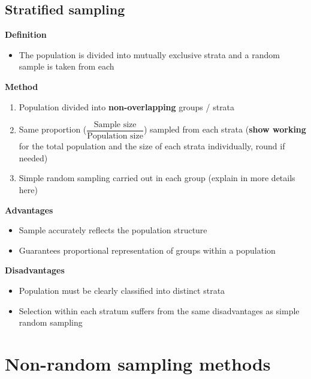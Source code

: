 \documentclass[oneside,fleqn,11pt]{book}
\begin{document}
	\subsection{Stratified sampling}
	\textbf{Definition}
	\begin{itemize}
		\item The population is divided into mutually exclusive strata and a random sample is taken from each
	\end{itemize}
	\textbf{Method}
	\begin{enumerate}
		\item Population divided into \textbf{non-overlapping} groups / strata
		\item Same proportion ($\dfrac{\text{Sample size}}{\text{Population size}}$) sampled from each strata (\textbf{show working} for the total population and the size of each strata individually, round if needed)
		\item Simple random sampling carried out in each group (explain in more details here)
	\end{enumerate}
	\textbf{Advantages}
	\begin{itemize}
		\item Sample accurately reflects the population structure
		\item Guarantees proportional representation of groups within a population
	\end{itemize}
	\textbf{Disadvantages}
	\begin{itemize}
		\item Population must be clearly classified into distinct strata
		\item Selection within each stratum suffers from the same disadvantages as simple random sampling
	\end{itemize}
	\section{Non-random sampling methods}
\end{document}
